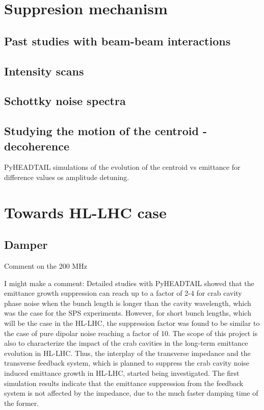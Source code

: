 \section{Suppresion mechanism}\label{sec:suppression_mechanism}
\subsection{Past studies with beam-beam interactions}\label{subsec:past_studies_impedance_suppression_BB}
\subsection{Intensity scans}
\subsection{Schottky noise spectra}
\subsection{Studying the motion of the centroid - decoherence}
PyHEADTAIL simulations of the evolution of the centroid vs emittance for difference values os amplitude detuning. 


\section{Towards HL-LHC case}
\subsection{Damper}
Comment on the 200 MHz

I might make a comment:
Detailed studies with PyHEADTAIL showed that the emittance growth suppression can reach up to a factor of 2-4 for crab cavity phase noise when the bunch length is longer than the cavity wavelength, which was the case for the SPS experiments. However, for short bunch lengths, which will be the case in the HL-LHC, the suppression factor was found to be similar to the case of pure dipolar noise reaching a factor of 10. The scope of this project is also to characterize the impact of the crab cavities in the long-term emittance evolution in HL-LHC. Thus, the interplay of the transverse impedance and the transverse feedback system, which is planned to suppress the crab cavity noise induced emittance growth in HL-LHC, started being investigated. The first simulation results indicate that the emittance suppression from the feedback system is not affected by the impedance, due to the much faster damping time of the former.

